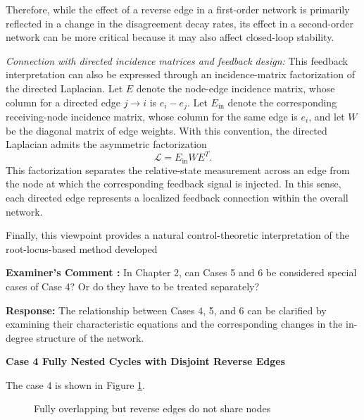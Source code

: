 \documentclass[11pt,a4paper]{article}
\newcounter{examcomment}
\renewcommand{\theexamcomment}{\arabic{examcomment}}
\newcommand{\comment}[1]{%
	\refstepcounter{examcomment}%
	\par\vspace{5pt}\noindent
	\colorbox{gray!13}{%
		\parbox{\dimexpr\linewidth-2\fboxsep}{%
			\textbf{Examiner's Comment \theexamcomment:} #1%
		}%
	}%
	\par
}
\newcommand{\response}{\par\textbf{Response:} }
\begin{document}
Therefore, while the effect of a reverse edge in a first-order network is primarily reflected in a change in the disagreement decay rates, its effect in a second-order network can be more critical because it may also affect closed-loop stability.

\textit{Connection with directed incidence matrices and feedback design:}
This feedback interpretation can also be expressed through an incidence-matrix factorization of the directed Laplacian. Let $E$ denote the node-edge incidence matrix, whose column for a directed edge $j\rightarrow i$ is $e_i-e_j$. Let $E_{\mathrm{in}}$ denote the corresponding receiving-node incidence matrix, whose column for the same edge is $e_i$, and let $W$ be the diagonal matrix of edge weights. With this convention, the directed Laplacian admits the asymmetric factorization
\begin{equation}
\mathcal{L}=E_{\mathrm{in}}WE^T.
\label{eq:directed_laplacian_factorization}
\end{equation}
This factorization separates the relative-state measurement across an edge from the node at which the corresponding feedback signal is injected. In this sense, each directed edge represents a localized feedback connection within the overall network.

Finally, this viewpoint provides a natural control-theoretic interpretation of the root-locus-based method developed

\comment{In Chapter 2, can Cases 5 and 6 be considered special cases of Case 4? Or do they have to be treated separately?}
\response
The relationship between Cases 4, 5, and 6 can be clarified by examining their characteristic equations and the corresponding changes in the in-degree structure of the network.

\textbf{Case 4 Fully Nested Cycles with Disjoint Reverse Edges}

The case 4 is shown in Figure \ref{Case4}.


 \begin{figure}[H]
		\centering
		\caption{Fully overlapping but reverse edges do not share nodes}
		\label{Case4}
	\end{figure} 
\medskip
\noindent
\end{document}
